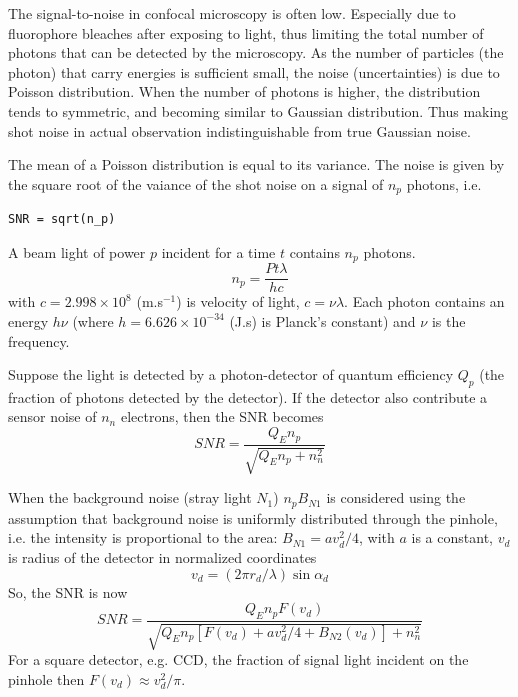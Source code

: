 The signal-to-noise in confocal microscopy is often low. Especially due to
fluorophore bleaches after exposing to light, thus limiting the total number of
photons that can be detected by the microscopy. As the number of particles (the
photon) that carry energies is sufficient small, the noise
(uncertainties) is due to Poisson distribution. When the number of photons is
higher, the distribution tends to symmetric, and becoming similar to Gaussian
distribution. Thus making shot noise in actual observation indistinguishable from true
Gaussian noise. 

The mean of a Poisson distribution is equal to its variance. The noise is given
by the square root of the vaiance of the shot noise on a signal of $n_p$
photons, i.e.

\begin{verbatim}	
SNR = sqrt(n_p)
\end{verbatim}

A beam light of power $p$ incident for a time $t$ contains $n_p$ photons.
\begin{equation}
n_p = \frac{Pt\lambda}{hc}
\end{equation}
with $c=2.998\times 10^8$ (m.s$^{-1}$) is velocity of light, $c=\nu \lambda $.
Each photon contains an energy $h\nu$ (where $h=6.626\times 10^{-34}$ (J.s) is
Planck's constant) and $\nu$ is the frequency.

Suppose the light is detected by a photon-detector of quantum efficiency $Q_p$
(the fraction of photons detected by the detector). If the detector also
contribute a sensor noise of $n_n$ electrons, then the SNR becomes
\begin{equation}
SNR = \frac{Q_En_p}{\sqrt{Q_En_p+n^2_n}}
\end{equation}

When the background noise (stray light $N_1$) $n_pB_{N1}$ is considered using
the assumption that background noise is uniformly distributed through the
pinhole, i.e. the intensity is proportional to the area: $B_{N1}=av^2_d/4$, with
$a$ is a constant, $v_d$ is radius of the detector in normalized coordinates
\begin{equation}
v_d = (2\pi r_d/\lambda)\sin \alpha_d
\end{equation} 
So, the SNR is now
\begin{equation}
SNR =
\frac{Q_En_pF(v_d)}{\sqrt{Q_En_p\left[F(v_d)+av^2_d/4+B_{N2}(v_d)\right]+n^2_n}}
\end{equation}
For a square detector, e.g. CCD, the fraction of signal light incident on the
pinhole then $F(v_d)\approx v^2_d/\pi$.

